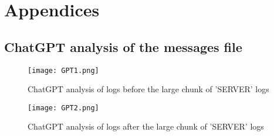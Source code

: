 \documentclass[
	letterpaper, %
	10pt, %
	unnumberedsections, %
	twoside, %
]{APAAssignment}
\begin{document}




\appendix


\clearpage
\chapter{Appendices}
\begin{appendices}
	\section{ChatGPT analysis of the messages file}\label{app:ChatGPTMessagesAnslysis}
	\begin{figure}[!htp] %
		\centering
		\texttt{[image: GPT1.png]}
		\caption{ChatGPT analysis of logs before the large chunk of 'SERVER' logs}	\label{fig:GPT1.png}
	\end{figure}
	\begin{figure}[!htp] %
		\centering
		\texttt{[image: GPT2.png]}
		\caption{ChatGPT analysis of logs after the large chunk of 'SERVER' logs}	\label{fig:GPT2.png}
	\end{figure}



\end{appendices}
\end{document}
